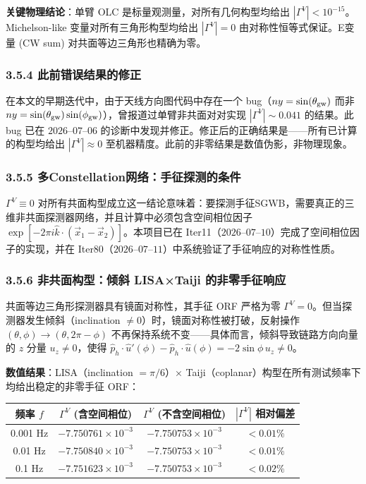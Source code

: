 \documentclass[12pt,a4paper]{article}
\begin{document}
\textbf{关键物理结论}：单臂 OLC 是标量观测量，对所有几何构型均给出 $|\Gamma^V| < 10^{-15}$。Michelson-like 变量对所有三角形构型均给出 $|\Gamma^V| = 0$ 由对称性恒等式保证。E变量 (CW sum) 对共面等边三角形也精确为零。

\subsubsection{3.5.4 此前错误结果的修正}

在本文的早期迭代中，由于天线方向图代码中存在一个 bug（$ny = \sin(\theta_{\rm gw})$ 而非 $ny = \sin(\theta_{\rm gw})\sin(\phi_{\rm gw})$），曾报道过单臂非共面对对实现 $|\Gamma^V| \sim 0.041$ 的结果。此 bug 已在 $2026$–$07$–$06$ 的诊断中发现并修正。修正后的正确结果是——所有已计算的构型均给出 $|\Gamma^V| \approx 0$ 至机器精度。此前的非零结果是数值伪影，非物理现象。

\subsubsection{3.5.5 多Constellation网络：手征探测的条件}

$\Gamma^V \equiv 0$ 对所有共面构型成立这一结论意味着：要探测手征SGWB，需要真正的三维非共面探测器网络，并且计算中必须包含空间相位因子 $\exp[-2\pi i \hat{k} \cdot (\vec{x}_1 - \vec{x}_2)]$。本项目已在 Iter11（$2026$–$07$–$10$）完成了空间相位因子的实现，并在 Iter80（$2026$–$07$–$11$）中系统验证了手征响应的对称性性质。

\subsubsection{3.5.6 非共面构型：倾斜 LISA×Taiji 的非零手征响应}

共面等边三角形探测器具有镜面对称性，其手征 ORF 严格为零 $\Gamma^V = 0$。但当探测器发生倾斜（inclination $\neq 0$）时，镜面对称性被打破，反射操作 $(\theta,\phi)\to(\theta,2\pi-\phi)$ 不再保持系统不变——具体而言，倾斜导致链路方向向量的 $z$ 分量 $u_z \neq 0$，使得 $\hat{p}_h\cdot\hat{u}'(\phi) - \hat{p}_h\cdot\hat{u}(\phi) = -2\sin\phi\,u_z \neq 0$。

\textbf{数值结果}：LISA（inclination $=\pi/6$）× Taiji（coplanar）构型在所有测试频率下均给出稳定的非零手征 ORF：

\begin{tabular}{|c|c|c|c|}
\hline
频率 $f$ & $\Gamma^V$ (含空间相位) & $\Gamma^V$ (不含空间相位) & $|\Gamma^V|$ 相对偏差 \\
\hline
0.001 Hz & $-7.750761\times 10^{-3}$ & $-7.750753\times 10^{-3}$ & $< 0.01\%$ \\
0.01 Hz & $-7.750840\times 10^{-3}$ & $-7.750753\times 10^{-3}$ & $< 0.01\%$ \\
0.1 Hz & $-7.751623\times 10^{-3}$ & $-7.750753\times 10^{-3}$ & $< 0.02\%$ \\
\hline
\end{tabular}
\end{document}
